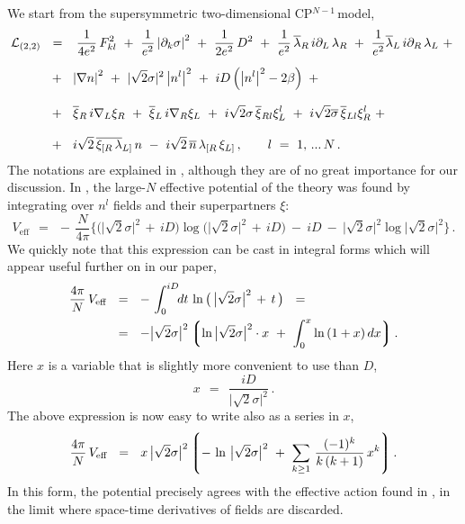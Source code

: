 \documentclass[epsfig,12pt]{article}
\def\beq{\begin{equation}}
\def\eeq{\end{equation}}
\newcommand{\p}{\partial}
\newcommand{\ov}{\overline}
\newcommand{\mc}[1]{\mathcal{#1}}
\newcommand{\lgr}{\left\lgroup}
\newcommand{\rgr}{\right\rgroup}
\newcommand{\bxir}{\ov{\xi}{}_R}
\newcommand{\bxil}{\ov{\xi}{}_L}
\newcommand{\xir}{\xi_R}
\newcommand{\xil}{\xi_L}
\newcommand{\nbar}{\ov{n}}
\newcommand{\cpn}{CP$^{N-1}$\,}
\newcommand{\lar}{\lambda_R}
\newcommand{\lal}{\lambda_L}
\newcommand{\blar}{\ov{\lambda}{}_R}
\newcommand{\blal}{\ov{\lambda}{}_L}
\begin{document}
	We start from the supersymmetric two-dimensional \cpn model,
\begin{align}
\label{sigma22}
% 
\notag
 	\mc{L}_\text{(2,2)} & ~~=~~
	\,\frac{1}{4e^2}\,F_{kl}^2  ~+~ \frac{1}{e^2} \left|\p_k \sigma\right|^2 
	~+~ \frac{1}{2e^2}\, D^2
	~+~ \frac{1}{e^2}\, \blar\, i\p_L\, \lar  ~+~  \frac{1}{e^2} \blal\, i\p_R\, \lal
	~+~
	\\[2mm]
%
	&
	~~+~~
	\left| \nabla n \right|^2  ~+~ | \sqrt{2}\sigma |^2 \left| n^l \right|^2
	~+~ iD \left( \left|n^l \right|^2 - 2\beta \right)
	~+~
	\\[2.8mm]
%
\notag	&
	~~+~~ \bxir\, i\nabla_L \xir  ~+~ \bxil\, i\nabla_R \xil ~+~
	i\sqrt{2}\sigma\, \ov{\xi}{}_{Rl} \xi_L^l
	~+~ i\sqrt{2}\ov{\sigma}\, \ov{\xi}{}_{Ll} \xi_R^l
	~+~
	\\[2.8mm]
%
\notag
	&
	~~+~~ i\sqrt{2}\, \ov{\xi_{[R}\, \lambda}{}_{L]}\, n
	~-~ i\sqrt{2}\, \nbar\,  \lambda_{[R}\, \xi_{L]}\,,
	\qquad
	l  ~=~  1,\,...\,N\,.
\end{align}
	The notations are explained in \cite{BSY3}, although they are of no great importance
	for our discussion. 
	In \cite{SYhet}, the large-$ N $ effective potential of the theory was found
	by integrating over $ n^l $ fields and their superpartners $ \xi $:
\beq
\label{Veff}
	V_\text{eff}    ~~=~~    -\, \frac{N}{4\pi} 
	\bigg\{
		\big( \big|\sqrt{2}\sigma\big|^2 \,+\, iD \big) 
		\log \big( \big|\sqrt{2}\sigma\big|^2 \,+\, iD \big)
		~-~
		iD
		~-~
		\big|\sqrt{2}\sigma\big|^2 \log \big|\sqrt{2}\sigma\big|^2
	\bigg\}\,.
\eeq
	We quickly note that this expression can be cast
	in integral forms which will appear useful further on in our paper,
\begin{align}
%
\notag
	\frac{4\pi}{N}\, V_\text{eff} &    ~~=~~    -\, \int_0^{iD} \!\!dt\, \ln \big(\, \big|\sqrt{2}\sigma\big|^2 \,+\, t \,\big)
	~~=
	\\
%
\label{Vint}
	&
	~~=~~    - \big|\sqrt{2}\sigma\big|^2 \lgr \ln \big|\sqrt{2}\sigma\big|^2 \cdot x ~+~
						\int_0^x \ln\, (1 + x)\, dx \rgr.
\end{align}
	Here $ x $ is a variable that is slightly more convenient to use than $ D $,
\beq
	x    ~~=~~    \frac{iD}{\big|\sqrt{2}\sigma\big|^2}\,.
\eeq
	The above expression is now easy to write also as a series in $ x $,
\beq
\label{Vser}
	 \frac{4\pi}{N}\, V_\text{eff}    ~~=~~
		x\, \big|\sqrt{2}\sigma\big|^2 \lgr -\, \ln\, \big|\sqrt{2}\sigma\big|^2 ~+~
		\sum_{k \geq 1}\, \frac{(-1)^k} 
                                      { k\,(k + 1) }\, x^k \rgr.
\eeq
	In this form, the potential precisely agrees with the effective action found in \cite{1p},
	in the limit where space-time derivatives of fields are discarded.
\end{document}
